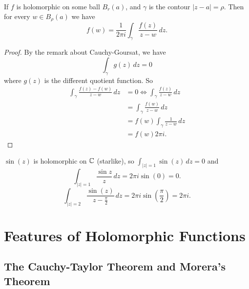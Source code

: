 \documentclass[10pt, a4paper]{article}
\begin{document}
\begin{theorem}
    If $f$ is holomorphic on some ball $B_r(a)$,
    and $\gamma$ is the contour $|z - a| = \rho$.
    Then for every $w \in B_{\rho}(a)$ we have
    \[
    f(w) = \frac{1}{2\pi i}\int_{\gamma}\frac{f(z)}{z - w}\,dz.
    \]
    
    \begin{proof}
        By the remark about Cauchy-Goursat,
        we have
        \[
        \int_{\gamma}g(z)\,dz = 0
        \]
        where $g(z)$ is the different quotient function.
        So
        \begin{align*}
            \int_{\gamma}\frac{f(z) - f(w)}{z - w}\,dz &= 0 \iff \int_{\gamma}\frac{f(z)}{z - w}\,dz \\
            &= \int_{\gamma}\frac{f(w)}{z - w}\,dz \\
            &= f(w)\int_{\gamma}\frac{1}{z - w}\,dz \\
            &= f(w)2\pi i.
        \end{align*}
    \end{proof}
\end{theorem}

\begin{example}
    $\sin(z)$ is holomorphic on $\mathbb{C}$
    (starlike),
    so $\int_{|z| = 1}\sin(z)\,dz = 0$ and
    \[
    \int_{|z| = 1}\frac{\sin{z}}{z}\,dz = 2\pi i\sin(0) = 0.
    \]
    \[
    \int_{|z| = 2}\frac{\sin(z)}{z - \frac{\pi}{2}}\,dz = 2\pi i\sin\left(\frac{\pi}{2}\right) = 2\pi i.
    \]
\end{example}

\newpage

\section{Features of Holomorphic Functions}

\subsection{The Cauchy-Taylor Theorem and Morera's Theorem}
\end{document}
